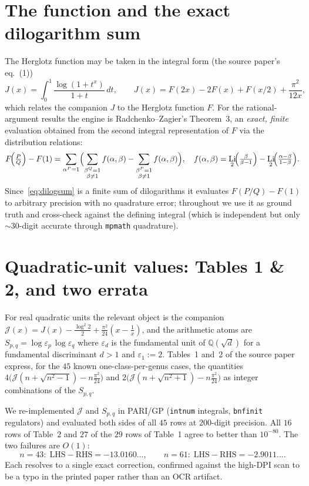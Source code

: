\documentclass[11pt]{article}
\DeclareMathOperator{\Li}{Li}
\newcommand{\Jcal}{\mathcal{J}}
\newcommand{\eps}{\varepsilon}
\theoremstyle{plain}\newtheorem{theorem}{Theorem}\newtheorem{proposition}[theorem]{Proposition}
\theoremstyle{remark}\newtheorem{remark}[theorem]{Remark}
\begin{document}
\section{The function and the exact dilogarithm sum}
The Herglotz function may be taken in the integral form (the source paper's eq.~(1))
\begin{equation}\label{eq:Jint}
  J(x)=\int_0^1\frac{\log(1+t^{x})}{1+t}\,dt,\qquad J(x)=F(2x)-2F(x)+F(x/2)+\frac{\pi^2}{12x},
\end{equation}
which relates the companion $J$ to the Herglotz function $F$. For the rational-argument results the engine is
Radchenko--Zagier's Theorem~3, an \emph{exact, finite} evaluation obtained from the second integral
representation of $F$ via the distribution relations:
\begin{equation}\label{eq:dilogsum}
  F\!\Bigl(\tfrac PQ\Bigr)-F(1)=\sum_{\alpha^P=1}\Bigl(\sum_{\substack{\beta^Q=1\\\beta\neq1}}f(\alpha,\beta)
  -\sum_{\substack{\beta^P=1\\\beta\neq1}}f(\alpha,\beta)\Bigr),\quad
  f(\alpha,\beta)=\Li_2\!\Bigl(\tfrac{\beta}{\beta-1}\Bigr)-\Li_2\!\Bigl(\tfrac{\alpha-\beta}{1-\beta}\Bigr).
\end{equation}
Since~\eqref{eq:dilogsum} is a finite sum of dilogarithms it evaluates $F(P/Q)-F(1)$ to arbitrary precision
with no quadrature error; throughout we use it as ground truth and cross-check against the defining integral
(which is independent but only $\sim\!30$-digit accurate through \texttt{mpmath} quadrature).

\section{Quadratic-unit values: Tables 1 \& 2, and two errata}\label{sec:tables}
For real quadratic units the relevant object is the companion
$\Jcal(x)=J(x)-\tfrac{\log^2 2}{2}+\tfrac{\pi^2}{24}(x-\tfrac1x)$, and the arithmetic atoms are
$S_{p,q}=\log\eps_p\,\log\eps_q$ where $\eps_d$ is the fundamental unit of $\mathbb Q(\sqrt d)$ for a
fundamental discriminant $d>1$ and $\eps_1:=2$. Tables~1 and~2 of the source paper express, for the $45$
known one-class-per-genus cases, the quantities
$4\bigl(\Jcal(n+\sqrt{n^2-1})-n\tfrac{\pi^2}{24}\bigr)$ and
$2\bigl(\Jcal(n+\sqrt{n^2+1})-n\tfrac{\pi^2}{24}\bigr)$ as integer combinations of the $S_{p,q}$.

We re-implemented $\Jcal$ and $S_{p,q}$ in PARI/GP (\texttt{intnum} integrals, \texttt{bnfinit} regulators)
and evaluated both sides of all $45$ rows at $200$-digit precision. All $16$ rows of Table~2 and $27$ of the
$29$ rows of Table~1 agree to better than $10^{-80}$. The two failures are $O(1)$:
\[
  \text{$n=43$:}\ \ \text{LHS}-\text{RHS}=-13.0160\ldots,\qquad
  \text{$n=61$:}\ \ \text{LHS}-\text{RHS}=-2.9011\ldots .
\]
Each resolves to a single exact correction, confirmed against the high-DPI scan to be a typo in the printed
paper rather than an OCR artifact.
\end{document}

